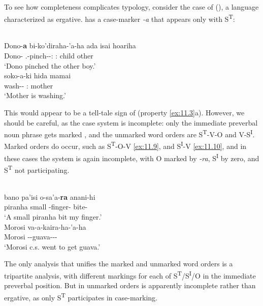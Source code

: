 \documentclass[output=paper]{langsci/langscibook}
\begin{document}
To see how completeness complicates  typology, consider the case of
 (\citealt{ChapmanDerbyshire1991}), a language characterized as
ergative.  has a case-marker \emph{-a} that appears only with
S\textsuperscript{T}:

\ea%
    \label{ex:11.7} {\parencite[164]{ChapmanDerbyshire1991}}\\
    \gll Dono-\textbf{a}  bi-ko’diraha-’a-ha      ada    isai    hoariha\\
        Dono-\Erg{}  \Tsg.\Tr{}-pinch-\Asp-\Th:\M{}  \Dem:\M{}  child  other\\
    \glt ‘Dono pinched the other boy.’
\ex%
    \label{ex:11.8} {\parencite[163]{ChapmanDerbyshire1991}}\\
    \gll soko-a-ki      hida    mamai\\
        wash-\Detr-\Nth{}  \Dem:\glossF{}  mother\\
    \glt ‘Mother is washing.’
\z

This would appear to be a tell-tale sign of  (property \ref{ex:11.3}a).
However, we should be careful, as the case system is incomplete: only the
immediate preverbal noun phrase gets marked
\parencite[250]{ChapmanDerbyshire1991}, and the unmarked word orders are
S\textsuperscript{T}{}-V-O and V-S\textsuperscript{I}. Marked orders do occur,
such as S\textsuperscript{T}{}-O-V \eqref{ex:11.9}, and S\textsuperscript{I}{}-V \eqref{ex:11.10}, and
in these cases the system is again incomplete, with O marked by \emph{{}-ra},
S\textsuperscript{I} by zero, and S\textsuperscript{T} not participating.

\ea%
    \label{ex:11.9} {\parencite[197]{ChapmanDerbyshire1991}}\\
    \gll bano    pa'isi  o-sa'a-\textbf{ra}      anani-hi\\
        piranha  small  \Fsg{}-finger-\Obj{}  bite-\Th{}\\
    \glt ‘A small piranha bit my finger.’
\ex%
    \label{ex:11.10}
    {\parencite[197]{ChapmanDerbyshire1991}}\\
    \gll Morosi  va-a-kaira-ha-’a-ha\\
        Morosi  \Tpl{}-\Vblz{}-guava-\Prt-\Asp-\Th{}\\
    \glt ‘Morosi c.s. went to get guava.’
\z

The only analysis that unifies the marked and unmarked word orders is a
tripartite analysis, with different markings for each of
S\textsuperscript{T}/S\textsuperscript{I}/O in the immediate preverbal
position. But in unmarked orders  is apparently incomplete rather than
ergative, as only S\textsuperscript{T} participates in case-marking.
\end{document}
